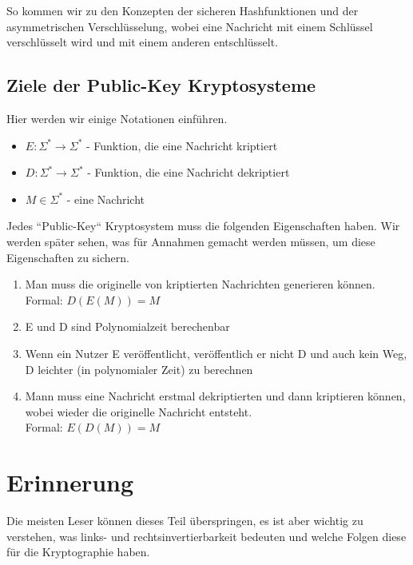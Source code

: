 \documentclass[12pt,a4paper]{article}
\theoremstyle{definition}
\begin{document}
    So kommen wir zu den Konzepten der sicheren Hashfunktionen und der asymmetrischen Verschlüsselung,
    wobei eine Nachricht mit einem Schlüssel verschlüsselt wird und mit einem anderen entschlüsselt.

    \subsection{Ziele der Public-Key Kryptosysteme}
    Hier werden wir einige Notationen einführen.

    \begin{itemize}
        \item $E: \Sigma^* \longrightarrow \Sigma^*$ - Funktion, die eine Nachricht kriptiert
        \item $D: \Sigma^* \longrightarrow \Sigma^*$ - Funktion, die eine Nachricht dekriptiert
        \item $M \in \Sigma^*$ - eine Nachricht
    \end{itemize}

    Jedes ``Public-Key`` Kryptosystem muss die folgenden Eigenschaften haben. Wir werden später sehen, was für
    Annahmen gemacht werden müssen, um diese Eigenschaften zu sichern.

    \begin{enumerate}
        \item Man muss die originelle von kriptierten Nachrichten generieren können. \\
        Formal: $D(E(M)) = M$
        \item E und D sind Polynomialzeit berechenbar
        \item Wenn ein Nutzer E veröffentlicht, veröffentlich er nicht D und auch kein Weg, D leichter (in polynomialer
        Zeit) zu berechnen
        \item Mann muss eine Nachricht erstmal dekriptierten und dann kriptieren können, wobei wieder die originelle
        Nachricht entsteht. \\
        Formal: $E(D(M)) = M$
    \end{enumerate}

    \section{Erinnerung}

    Die meisten Leser können dieses Teil überspringen, es ist aber wichtig zu verstehen, was links- und
    rechtsinvertierbarkeit bedeuten und welche Folgen diese für die Kryptographie haben.
\end{document}
